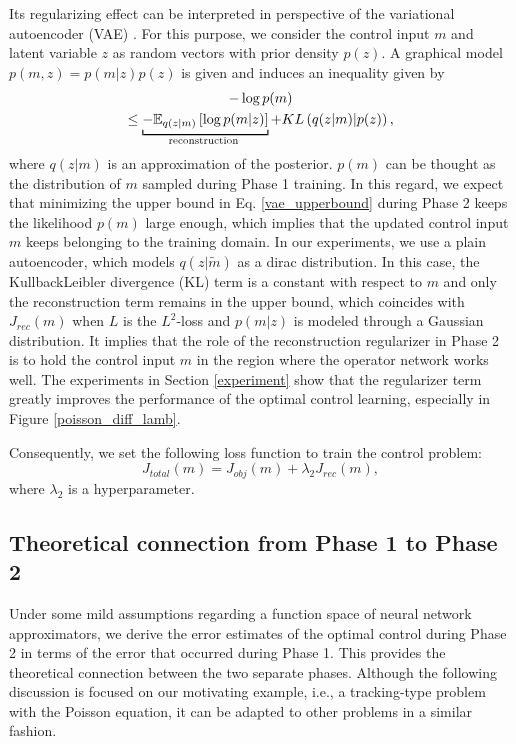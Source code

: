 \documentclass[letterpaper]{article}
\begin{document}
Its regularizing effect can be interpreted in perspective of the variational autoencoder (VAE) \citep{kingma2013auto}. For this purpose, we consider the control input $m$ and latent variable $z$ as random vectors with prior density $p(z)$. A graphical model $p(m,z) = p(m|z)p(z)$ is given and induces an inequality given by 
\begin{multline}\label{vae_upperbound}
  -\log p(m) \\
   \leq \underbracket[0.8pt]{-\mathbb{E}_{q(z|m)}\left[\log p(m| z) \right] }_\text{\clap{reconstruction~}} +KL\left(q(z|m) |p(z) \right),
\end{multline} 
where $q(z|m)$ is an approximation of the posterior. $p(m)$ can be thought as the distribution of $m$ sampled during Phase 1 training. In this regard, we expect that minimizing the upper bound in Eq. \eqref{vae_upperbound} during Phase 2 keeps the likelihood $p(m)$ large enough, which implies that the updated control input $m$ keeps belonging to the training domain. In our experiments, we use a plain autoencoder, which models $q(z|\tilde{m})$ as a dirac distribution. In this case, the KullbackLeibler divergence (KL) term is a constant with respect to $m$ and only the reconstruction term remains in the upper bound, which coincides with $J_{rec}(m)$ when $L$ is the $L^2$-loss and $p(m|z)$ is modeled through a Gaussian distribution. It implies that the role of the reconstruction regularizer in Phase 2 is to hold the control input $m$ in the region where the operator network works well. The experiments in Section \ref{experiment} show that the regularizer term greatly improves the performance of the optimal control learning, especially in Figure \ref{poisson_diff_lamb}.

Consequently, we set the following loss function to train the control problem:
\begin{equation}
  J_{total}(m)=J_{obj}(m)+\lambda_2 J_{rec}(m),
\end{equation}
where $\lambda_2$ is a hyperparameter.

\subsection*{Theoretical connection from Phase 1 to Phase 2} \label{section3_3}
Under some mild assumptions regarding a function space of neural network approximators, we derive the error estimates of the optimal control during Phase 2 in terms of the error that occurred during Phase 1. This provides the theoretical connection between the two separate phases. Although the following discussion is focused on our motivating example, i.e., a tracking-type problem with the Poisson equation, it can be adapted to other problems in a similar fashion.
\end{document}

